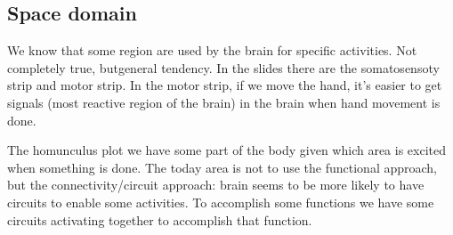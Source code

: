 \subsection{Space domain}
We know that some region are used by the brain for specific activities. Not completely true, butgeneral tendency. In the slides there are the somatosensoty strip and motor strip. In the motor strip, if we move the hand, it's easier to get signals (most reactive region of the brain) in the brain when hand movement is done.

The homunculus plot we have some part of the body given which area is excited when something is done. The today area is not to use the functional approach, but the connectivity/circuit approach: brain seems to be more likely to have circuits to enable some activities. To accomplish some functions we have some circuits activating together to accomplish that function.
